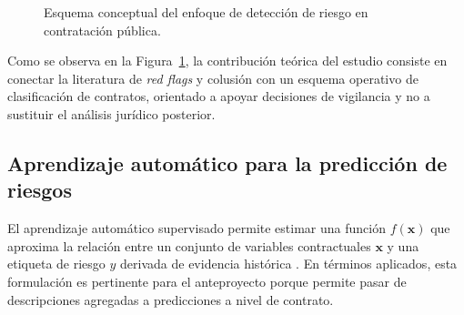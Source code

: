 \begin{figure}[H]
    \centering
    \shorthandoff{<>}
    \shorthandon{<>}
    \caption{Esquema conceptual del enfoque de detección de riesgo en contratación pública.}
    \label{fig:flujo-riesgo-contratacion}
\end{figure}

Como se observa en la Figura~\ref{fig:flujo-riesgo-contratacion}, la contribución teórica del estudio consiste en conectar la literatura de \textit{red flags} y colusión con un esquema operativo de clasificación de contratos, orientado a apoyar decisiones de vigilancia y no a sustituir el análisis jurídico posterior.

\subsection{Aprendizaje automático para la predicción de riesgos}

El aprendizaje automático supervisado permite estimar una función $f(\mathbf{x})$ que aproxima la relación entre un conjunto de variables contractuales $\mathbf{x}$ y una etiqueta de riesgo $y$ derivada de evidencia histórica \cite{tas2024machine, gallego2021preventing}. En términos aplicados, esta formulación es pertinente para el anteproyecto porque permite pasar de descripciones agregadas a predicciones a nivel de contrato.

